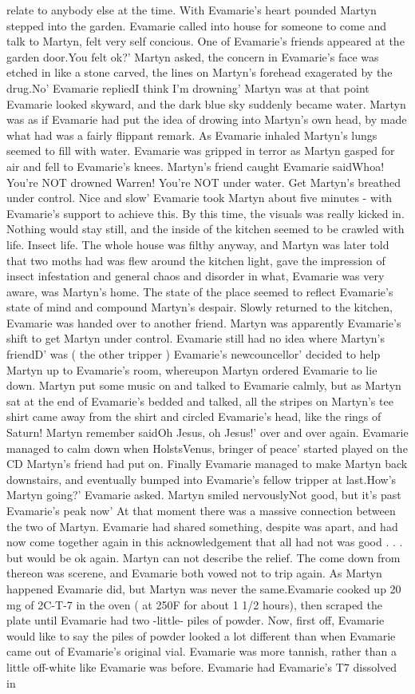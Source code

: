 \documentclass[12pt]{book}
\begin{document}
relate to anybody else at the time. With Evamarie's heart pounded Martyn stepped into the garden. Evamarie called into house for someone to come and talk to Martyn, felt very self concious. One of Evamarie's friends appeared at the garden door.You felt ok?' Martyn asked, the concern in Evamarie's face was etched in like a stone carved, the lines on Martyn's forehead exagerated by the drug.No' Evamarie repliedI think I'm drowning' Martyn was at that point Evamarie looked skyward, and the dark blue sky suddenly became water. Martyn was as if Evamarie had put the idea of drowing into Martyn's own head, by made what had was a fairly flippant remark. As Evamarie inhaled Martyn's lungs seemed to fill with water. Evamarie was gripped in terror as Martyn gasped for air and fell to Evamarie's knees. Martyn's friend caught Evamarie saidWhoa! You're NOT drowned Warren! You're NOT under water. Get Martyn's breathed under control. Nice and slow' Evamarie took Martyn about five minutes - with Evamarie's support to achieve this. By this time, the visuals was really kicked in. Nothing would stay still, and the inside of the kitchen seemed to be crawled with life. Insect life. The whole house was filthy anyway, and Martyn was later told that two moths had was flew around the kitchen light, gave the impression of insect infestation and general chaos and disorder in what, Evamarie was very aware, was Martyn's home. The state of the place seemed to reflect Evamarie's state of mind and compound Martyn's despair. Slowly returned to the kitchen, Evamarie was handed over to another friend. Martyn was apparently Evamarie's shift to get Martyn under control. Evamarie still had no idea where Martyn's friendD' was ( the other tripper ) Evamarie's newcouncellor' decided to help Martyn up to Evamarie's room, whereupon Martyn ordered Evamarie to lie down. Martyn put some music on and talked to Evamarie calmly, but as Martyn sat at the end of Evamarie's bedded and talked, all the stripes on Martyn's tee shirt came away from the shirt and circled Evamarie's head, like the rings of Saturn! Martyn remember saidOh Jesus, oh Jesus!' over and over again. Evamarie managed to calm down when HolstsVenus, bringer of peace' started played on the CD Martyn's friend had put on. Finally Evamarie managed to make Martyn back downstairs, and eventually bumped into Evamarie's fellow tripper at last.How's Martyn going?' Evamarie asked. Martyn smiled nervouslyNot good, but it's past Evamarie's peak now' At that moment there was a massive connection between the two of Martyn. Evamarie had shared something, despite was apart, and had now come together again in this acknowledgement that all had not was good . . .  but would be ok again. Martyn can not describe the relief. The come down from thereon was scerene, and Evamarie both vowed not to trip again. As Martyn happened Evamarie did, but Martyn was never the same.Evamarie cooked up 20 mg of 2C-T-7 in the oven ( at 250F for about 1 1/2 hours), then scraped the plate until Evamarie had two -little- piles of powder. Now, first off, Evamarie would like to say the piles of powder looked a lot different than when Evamarie came out of Evamarie's original vial. Evamarie was more tannish, rather than a little off-white like Evamarie was before. Evamarie had Evamarie's T7 dissolved in 
\end{document}
